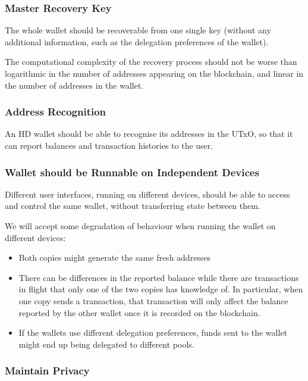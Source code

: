 \documentclass[11pt,a4paper]{article}
\begin{document}
\subsubsection{Master Recovery Key}\label{master-recovery-key}

The whole wallet should be recoverable from one single key (without any
additional information, such as the delegation preferences of the
wallet).

The computational complexity of the recovery process should not be worse
than logarithmic in the number of addresses appearing on the blockchain,
and linear in the number of addresses in the wallet.

\subsubsection{Address Recognition}\label{address-recognition}

An HD wallet should be able to recognise its addresses in the UTxO, so
that it can report balances and transaction histories to the user.

\subsubsection{Wallet should be Runnable on Independent
Devices}\label{wallet-should-be-runnable-on-independent-devices}

Different user interfaces, running on different devices, should be able
to access and control the same wallet, without transferring state
between them.

We will accept some degradation of behaviour when running the wallet on
different devices:

\begin{itemize}
\item
  Both copies might generate the same fresh addresses
\item
  There can be differences in the reported balance while there are
  transactions in flight that only one of the two copies has knowledge
  of. In particular, when one copy sends a transaction, that transaction
  will only affect the balance reported by the other wallet once it is
  recorded on the blockchain.
\item
  If the wallets use different delegation preferences, funds sent to the
  wallet might end up being delegated to different pools.
\end{itemize}

\subsubsection{Maintain Privacy}\label{maintain-privacy}
\end{document}
